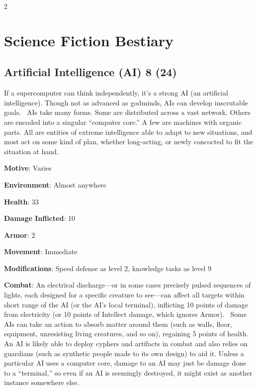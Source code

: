 \begin{multicols}{2}

\section{Science Fiction Bestiary}

\subsection{Artificial Intelligence (AI) 8 (24)}

If a supercomputer can think independently, it’s a strong AI (an artificial intelligence). Though not as advanced as godminds, AIs can develop inscrutable goals. 
AIs take many forms. Some are distributed across a vast network. Others are encoded into a singular “computer core.” A few are machines with organic parts. All are entities of extreme intelligence able to adapt to new situations, and most act on some kind of plan, whether long-acting, or newly concocted to fit the situation at hand. 

\textbf{Motive}: Varies 

\textbf{Environment}: Almost anywhere 

\textbf{Health}: 33 

\textbf{Damage Inflicted}:  10 

\textbf{Armor}: 2 

\textbf{Movement}: Immediate 

\textbf{Modifications}: Speed defense as level 2, knowledge tasks as level 9 

\textbf{Combat}: An electrical discharge—or in some cases precisely pulsed sequences of lights, each designed for a specific creature to see—can affect all targets within short range of the AI (or the AI’s local terminal), inflicting 10 points of damage from electricity (or 10 points of Intellect damage, which ignores Armor). 
Some AIs can take an action to absorb matter around them (such as walls, floor, equipment, unresisting living creatures, and so on), regaining 5 points of health. 
An AI is likely able to deploy cyphers and artifacts in combat and also relies on guardians (such as synthetic people made to its own design) to aid it. Unless a particular AI uses a computer core, damage to an AI may just be damage done to a “terminal,” so even if an AI is seemingly destroyed, it might exist as another instance somewhere else. 


\end{multicols}
